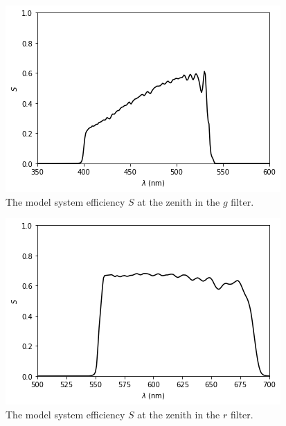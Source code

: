 \begin{figure}
\begin{center}
\includegraphics[width=0.9\linewidth]{figures/huitzi-S-g.png}
\medskip
\caption{The model system efficiency $S$ at the zenith in the $g$ filter.}
\end{center}
\end{figure}

\begin{figure}
\begin{center}
\includegraphics[width=0.9\linewidth]{figures/huitzi-S-r.png}
\medskip
\caption{The model system efficiency $S$ at the zenith in the $r$ filter.}
\end{center}
\end{figure}


